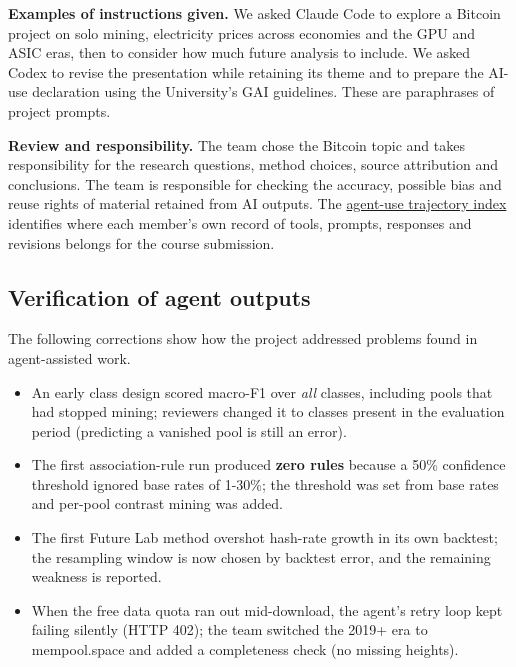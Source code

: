 \documentclass[
  11pt,
  a4paper,
]{article}
\providecommand{\tightlist}{%
  \setlength{\itemsep}{0pt}\setlength{\parskip}{0pt}}
\begin{document}
\textbf{Examples of instructions given.} We asked Claude Code to explore
a Bitcoin project on solo mining, electricity prices across economies
and the GPU and ASIC eras, then to consider how much future analysis to
include. We asked Codex to revise the presentation while retaining its
theme and to prepare the AI-use declaration using the University's GAI
guidelines. These are paraphrases of project prompts.

\textbf{Review and responsibility.} The team chose the Bitcoin topic and
takes responsibility for the research questions, method choices, source
attribution and conclusions. The team is responsible for checking the
accuracy, possible bias and reuse rights of material retained from AI
outputs. The
\href{https://github.com/ansonlo-dev/HashAtlas/tree/main/agent_trajectories}{agent-use
trajectory index} identifies where each member's own record of tools,
prompts, responses and revisions belongs for the course submission.


\subsection{Verification of agent
outputs}\label{verification-of-agent-outputs}

The following corrections show how the project addressed problems found
in agent-assisted work.

\begin{itemize}
\tightlist
\item
  An early class design scored macro-F1 over \emph{all} classes,
  including pools that had stopped mining; reviewers changed it to
  classes present in the evaluation period (predicting a vanished pool
  is still an error).
\item
  The first association-rule run produced \textbf{zero rules} because a
  50\% confidence threshold ignored base rates of 1-30\%; the threshold
  was set from base rates and per-pool contrast mining was added.
\item
  The first Future Lab method overshot hash-rate growth in its own
  backtest; the resampling window is now chosen by backtest error, and
  the remaining weakness is reported.
\item
  When the free data quota ran out mid-download, the agent's retry loop
  kept failing silently (HTTP 402); the team switched the 2019+ era to
  mempool.space and added a completeness check (no missing heights).
\end{itemize}
\end{document}
